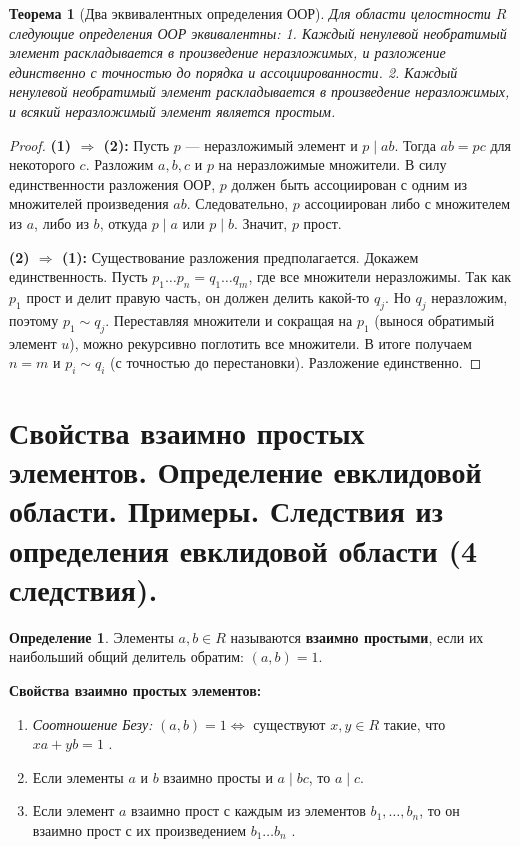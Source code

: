 \documentclass[12pt, a4paper]{article}
\theoremstyle{definition}
\newtheorem{definition}{Определение}[section]
\theoremstyle{plain}
\newtheorem{theorem}{Теорема}[section]
\begin{document}
	\begin{theorem}[Два эквивалентных определения ООР]
		Для области целостности $R$ следующие определения ООР эквивалентны:
		1. Каждый ненулевой необратимый элемент раскладывается в произведение неразложимых, и разложение единственно с точностью до порядка и ассоциированности.
		2. Каждый ненулевой необратимый элемент раскладывается в произведение неразложимых, и всякий неразложимый элемент является простым.
	\end{theorem}
	\begin{proof}
		\textbf{(1) $\Rightarrow$ (2):} Пусть $p$ — неразложимый элемент и $p \mid ab$. Тогда $ab = pc$ для некоторого $c$. Разложим $a, b, c$ и $p$ на неразложимые множители. В силу единственности разложения ООР, $p$ должен быть ассоциирован с одним из множителей произведения $ab$. Следовательно, $p$ ассоциирован либо с множителем из $a$, либо из $b$, откуда $p \mid a$ или $p \mid b$. Значит, $p$ прост.
		
		\textbf{(2) $\Rightarrow$ (1):} Существование разложения предполагается. Докажем единственность. Пусть $p_1 \dots p_n = q_1 \dots q_m$, где все множители неразложимы. Так как $p_1$ прост и делит правую часть, он должен делить какой-то $q_j$. Но $q_j$ неразложим, поэтому $p_1 \sim q_j$. Переставляя множители и сокращая на $p_1$ (вынося обратимый элемент $u$), можно рекурсивно поглотить все множители. В итоге получаем $n=m$ и $p_i \sim q_i$ (с точностью до перестановки). Разложение единственно.
	\end{proof}
	
	\newpage
	\section{Свойства взаимно простых элементов. Определение евклидовой области. Примеры. Следствия из определения евклидовой области (4 следствия).}
	
	\begin{definition}
		Элементы $a,b \in R$ называются \textbf{взаимно простыми}, если их наибольший общий делитель обратим: $(a,b)=1$.
	\end{definition}
	
	\textbf{Свойства взаимно простых элементов:}
	\begin{enumerate}
		\item \textit{Соотношение Безу:} $(a,b)=1 \iff$ существуют $x, y \in R$ такие, что $xa+yb=1$ .
		\item Если элементы $a$ и $b$ взаимно просты и $a \mid bc$, то $a \mid c$.
		\item Если элемент $a$ взаимно прост с каждым из элементов $b_1, \dots, b_n$, то он взаимно прост с их произведением $b_1 \dots b_n$ .
	\end{enumerate}
	
\end{document}

